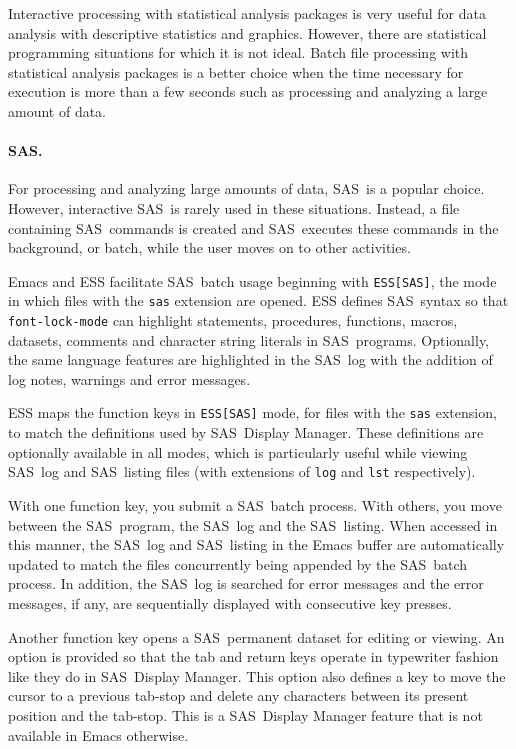 \documentclass{article}
\newcommand*{\SAS}{\textsc{SAS}}
\newcommand{\stexttt}[1]{{\small\texttt{#1}}}
\begin{document}
Interactive processing with statistical analysis packages is very
useful for data analysis with descriptive statistics and graphics.
However, there are statistical programming situations for which it
is not ideal.  Batch file processing with statistical analysis
packages is a better choice when the time necessary for execution
is more than a few seconds such as processing and analyzing a
large amount of data.


\paragraph{\SAS.}
\label{sec:sas-batch}

For processing and analyzing large amounts of data, \SAS\ is a popular
choice.  However, interactive \SAS\ is rarely used in these situations.
Instead, a file containing \SAS\ commands is created and \SAS\ executes
these commands in the background, or batch, while the user moves on to 
other activities.

Emacs and ESS facilitate \SAS\ batch usage beginning
with \stexttt{ESS[SAS]},
the mode in which files with the \stexttt{sas} extension are opened.
ESS defines \SAS\ syntax so that \stexttt{font-lock-mode} can highlight
statements, procedures, functions, macros, datasets, comments and character 
string literals in \SAS\ programs.  Optionally, the same language features 
are highlighted in the \SAS\ log with the addition of log notes, warnings 
and error messages.

ESS maps the function keys in \stexttt{ESS[SAS]} mode, for files with the
\stexttt{sas} extension, to match the definitions used by \SAS\
Display Manager.  These definitions are optionally
available in all modes, which is particularly useful
while viewing \SAS\ log and \SAS\ listing files (with extensions of
\stexttt{log} and \stexttt{lst} respectively).

With one function key, you submit a \SAS\ batch process.  With others,
you move between the \SAS\ program, the \SAS\ log and the \SAS\
listing.  When accessed in this manner, the \SAS\ log and \SAS\
listing in the Emacs buffer are automatically updated to match the
files concurrently being appended by the \SAS\ batch process.  In
addition, the \SAS\ log is searched for error messages and the error
messages, if any, are sequentially displayed with consecutive key
presses.

Another function key opens a \SAS\ permanent dataset for editing or viewing.  
An option is provided so that the tab and return keys operate in typewriter 
fashion like they do in \SAS\ Display Manager.  This option also defines a 
key to move the cursor to a previous tab-stop and delete any 
characters between its present position and the tab-stop.  This is a \SAS\
Display Manager feature that is not available in Emacs otherwise. 
\end{document}
